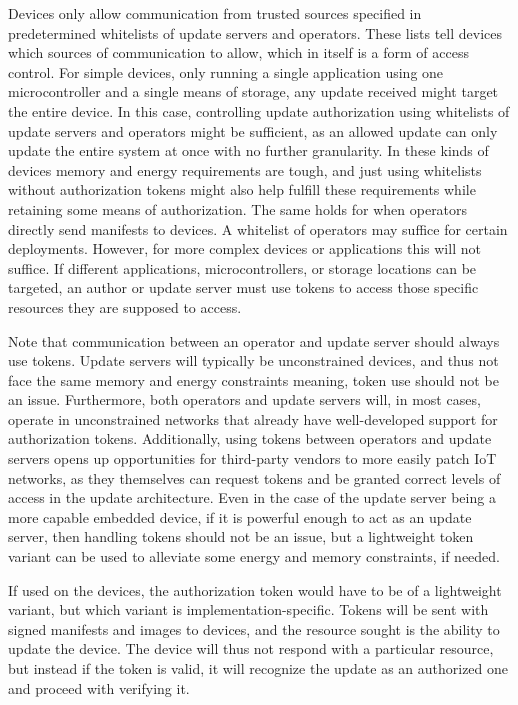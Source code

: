 \documentclass[0-thesis.tex]{subfiles}
\begin{document}
Devices only allow communication from trusted sources specified in predetermined
whitelists of update servers and operators. These lists tell devices which sources of
communication to allow, which in itself is a form of access control. For simple devices,
only running a single application using one microcontroller and a single means of storage,
any update received might target the entire device. In this case, controlling update
authorization using whitelists of update servers and operators might be sufficient, as an
allowed update can only update the entire system at once with no further granularity. In
these kinds of devices memory and energy requirements are tough, and just using
whitelists without authorization tokens might also help fulfill these requirements while
retaining some means of authorization. The same holds for when operators directly send
manifests to devices. A whitelist of operators may suffice for certain deployments.
However, for more complex devices or applications this will not suffice. If different
applications, microcontrollers, or storage locations can be targeted, an author or update
server must use tokens to access those specific resources they are supposed to access.

Note that communication between an operator and update server should always use tokens.
Update servers will typically be unconstrained devices, and thus not face the same memory
and energy constraints meaning, token use should not be an issue. Furthermore, both
operators and update servers will, in most cases, operate in unconstrained networks that
already have well-developed support for authorization tokens. Additionally, using tokens
between operators and update servers opens up opportunities for third-party vendors to
more easily patch IoT networks, as they themselves can request tokens and be granted
correct levels of access in the update architecture. Even in the case of the update server
being a more capable embedded device, if it is powerful enough to act as an update server,
then handling tokens should not be an issue, but a lightweight token variant can be used
to alleviate some energy and memory constraints, if needed.

If used on the devices, the authorization token would have to be of a lightweight variant,
but which variant is implementation-specific. Tokens will be sent with signed manifests
and images to devices, and the resource sought is the ability to update the device. The
device will thus not respond with a particular resource, but instead if the token is
valid, it will recognize the update as an authorized one and proceed with verifying it.
\end{document}
